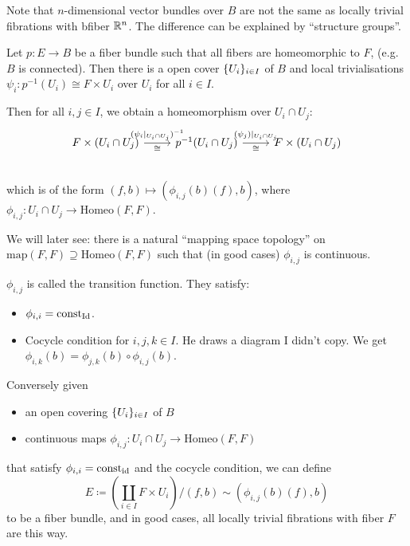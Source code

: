 \documentclass[language=english]{TemplateLecture}
\begin{document}
Note that \(n\)-dimensional vector bundles over \(B\) are not the same as locally trivial fibrations with bfiber \(\mathbb{R}^n\). The difference can be explained by \enquote{structure groups}.

\begin{construction}
    Let \(p \colon E \to B\) be a fiber bundle such that all fibers are homeomorphic to \(F\), (e.g. \(B\) is connected). Then there is a open cover \(\{U_i\}_{i \in I}\) of \(B\) and local trivialisations \(\psi_i\colon p^{-1}(U_i) \cong F \times U_i\) over \(U_i\) for all \(i \in I\).

    Then for all \(i,j \in I\), we obtain a homeomorphism over \(U_i \cap U_j\):
    \[\begin{tikzcd}
        F \times (U_i \cap U_j) \ar[r, "(\psi_i\rvert_{U_i \cap U_j})^{-1}", "\cong"'] & p^{-1}(U_i \cap U_j) \ar[r, "(\psi_j)\rvert_{U_i \cap U_j}", "\cong"'] & F\times (U_i \cap U_j) \\
    \end{tikzcd}\]
    which is of the form \((f,b) \mapsto (\phi_{i,j}(b)(f), b)\), where \(\phi_{i,j} \colon U_i \cap U_j \to \mathrm{Homeo}(F,F)\).

    We will later see: there is a natural \enquote{mapping space topology} on \(\mathrm{map}(F,F) \supseteq \mathrm{Homeo}(F,F)\) such that (in good cases) \(\phi_{i,j}\) is continuous.

    \(\phi_{i,j}\) is called the transition function. They satisfy:
    \begin{itemize}
        \item \(\phi_{i,i} = \operatorname{const}_{\operatorname{Id}}\).
        \item Cocycle condition for \(i,j,k \in I\). He draws a diagram I didn't copy. We get \(\phi_{i,k}(b) = \phi_{j,k}(b) \circ \phi_{i,j}(b)\).
    \end{itemize}

    Conversely given
    \begin{itemize}
        \item an open covering \(\{U_i\}_{i \in I}\) of \(B\)
        \item continuous maps \(\phi_{i,j}\colon U_i \cap U_j \to \mathrm{Homeo}(F,F)\)
    \end{itemize}
    that satisfy \(\phi_{i,i} = \operatorname{const}_{\operatorname{id}}\) and the cocycle condition, we can define
    \[E \coloneq (\coprod_{i \in I} F \times U_i) / (f,b) \sim (\phi_{i,j}(b)(f), b)\]
    to be a fiber bundle, and in good cases, all locally trivial fibrations with fiber \(F\) are this way.
\end{construction}
\end{document}
